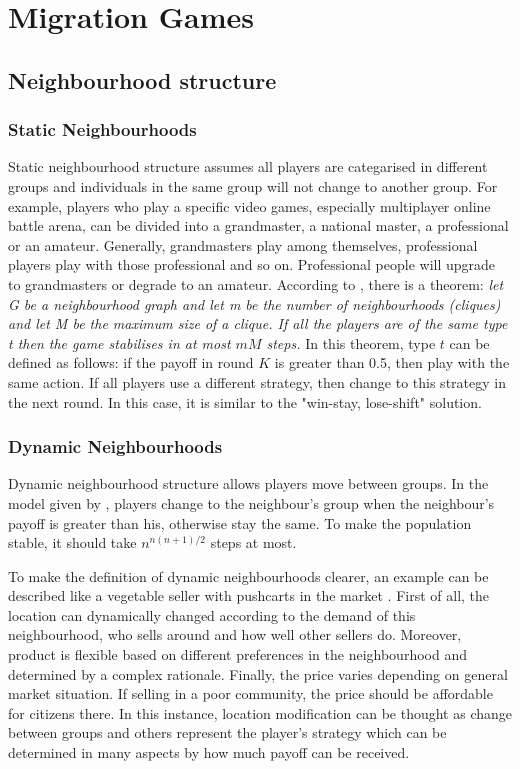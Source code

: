 \section{Migration Games}
\subsection{Neighbourhood structure}
\subsubsection{Static Neighbourhoods}
Static neighbourhood structure assumes all players are categarised in different groups and individuals in the same group will not change to another group. For example, players who play a specific video games, especially multiplayer online battle arena, can be divided into a grandmaster, a national master, a professional or an amateur. Generally, grandmasters play among themselves, professional players play with those professional and so on. Professional people will upgrade to grandmasters or degrade to an amateur. According to \citet{lecturePPT}, there is a theorem: \textit{let G be a neighbourhood graph and let m be the number of neighbourhoods (cliques) and let M be the maximum size of a clique. If all the players are of the same type t then the game stabilises in at most $mM$ steps.} In this theorem, type $t$ can be defined as follows: if the payoff in round $K$ is greater than 0.5, then play with the same action. If all players use a different strategy, then change to this strategy in the next round. In this case, it is similar to the "win-stay, lose-shift" solution.
\subsubsection{Dynamic Neighbourhoods}
Dynamic neighbourhood structure allows players move between groups. In the model given by \citet{lecturePPT}, players change to the neighbour's group when the neighbour's payoff is greater than his, otherwise stay the same. To make the population stable, it should take $n^{n(n+1)/2}$ steps at most.

To make the definition of dynamic neighbourhoods clearer, an example can be described like a vegetable seller with pushcarts in the market \citep{paul2011neighbourhood}. First of all, the location can dynamically changed according to the demand of this neighbourhood, who sells around and how well other sellers do. Moreover, product is flexible based on different preferences in the neighbourhood and determined by a complex rationale. Finally, the price varies depending on general market situation. If selling in a poor community, the price should be affordable for citizens there. In this instance, location modification can be thought as change between groups and others represent the player's strategy which can be determined in many aspects by how much payoff can be received.
